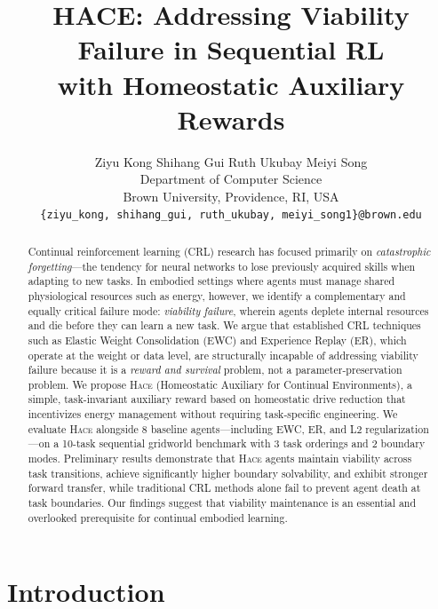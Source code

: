 \documentclass{article}
\title{HACE: Addressing Viability Failure in Sequential RL\\
with Homeostatic Auxiliary Rewards}
\author{
  Ziyu Kong \quad Shihang Gui \quad Ruth Ukubay \quad Meiyi Song \\
  Department of Computer Science \\
  Brown University, Providence, RI, USA \\
  \texttt{\{ziyu\_kong, shihang\_gui, ruth\_ukubay, meiyi\_song1\}@brown.edu}
}
\newcommand{\hace}{\textsc{Hace}}
\begin{document}
\maketitle

\begin{abstract}

Continual reinforcement learning (CRL) research has focused primarily on
\emph{catastrophic forgetting}—the tendency for neural networks to lose
previously acquired skills when adapting to new tasks. In embodied settings
where agents must manage shared physiological resources such as energy,
however, we identify a complementary and equally critical failure mode:
\emph{viability failure}, wherein agents deplete internal resources and die
before they can learn a new task. We argue that established CRL techniques
such as Elastic Weight Consolidation (EWC) and Experience Replay (ER),
which operate at the weight or data level, are structurally incapable of
addressing viability failure because it is a \emph{reward and survival}
problem, not a parameter-preservation problem. We propose \hace{}
(Homeostatic Auxiliary for Continual Environments), a simple, task-invariant
auxiliary reward based on homeostatic drive reduction that incentivizes
energy management without requiring task-specific engineering.
We evaluate \hace{} alongside 8 baseline agents—including EWC, ER, and L2
regularization—on a 10-task sequential gridworld benchmark with 3 task
orderings and 2 boundary modes. Preliminary results demonstrate that
\hace{} agents maintain viability across task transitions, achieve
significantly higher boundary solvability, and exhibit stronger forward
transfer, while traditional CRL methods alone fail to prevent agent death
at task boundaries. Our findings suggest that viability maintenance
is an essential and overlooked prerequisite for continual embodied learning.

\end{abstract}

\section{Introduction}
\label{sec:intro}
\end{document}
